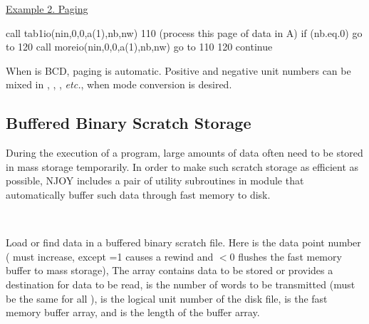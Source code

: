 \begin{center}
{\underline{Example 2.  Paging}}
\end{center}

\small
\begin{ccode}

      call tab1io(nin,0,0,a(1),nb,nw)
     110 (process this page of data in A)
      if (nb.eq.0) go to 120
      call moreio(nin,0,0,a(1),nb,nw)
      go to 110
     120 continue

\end{ccode}
\normalsize

\noindent
When  is BCD, paging is automatic.  Positive and negative
unit numbers can be mixed in , ,
, {\it etc.}, when mode conversion is desired.

\subsection{Buffered Binary Scratch Storage}
\label{ssNJOY_ScratchStor}

During the execution of a program, large amounts of data often need
to be stored in mass storage temporarily.  In order to make such
scratch storage as efficient as possible, NJOY includes  a pair of
utility subroutines in module 
that automatically buffer such data through fast memory to disk.

\begin{description}
\begin{singlespace}
\item[\cword{loada(i,a,na,ntape,buf,nbuf)}]

\item[\cword{finda(i,a,na,ntape,buf,nbuf)}] ~\par
Load or find data in a buffered binary scratch file.  Here
 is the data point number ( must increase, except
=1 causes a rewind and $<$0 flushes the fast memory
buffer to mass storage), The array  contains data to be
stored or provides a destination for data to be read, 
is the number of words to be transmitted (must be the same for all
),  is the logical unit number of the disk file,
 is the fast memory buffer array, and  is
the length of the buffer array.
\end{singlespace}
\end{description}


